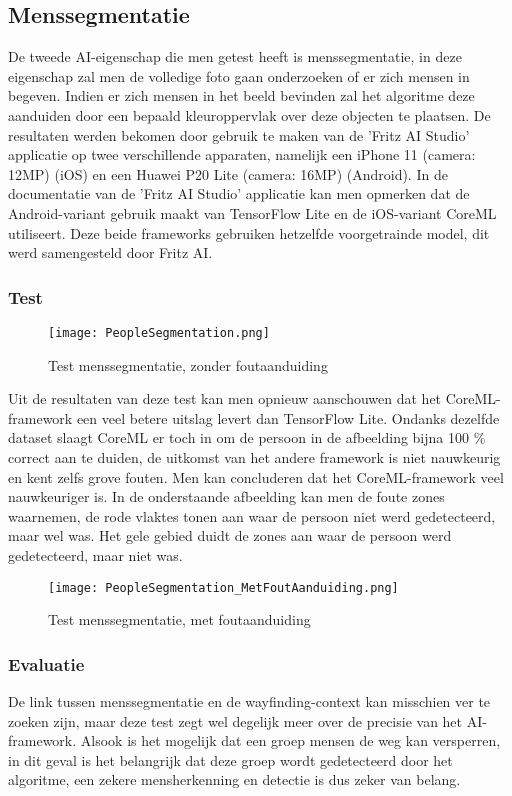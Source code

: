 \subsection{Menssegmentatie}
De tweede AI-eigenschap die men getest heeft is menssegmentatie, in deze eigenschap zal men de volledige foto gaan onderzoeken of er zich mensen in begeven. Indien er zich mensen in het beeld bevinden zal het algoritme deze aanduiden door een bepaald kleuroppervlak over deze objecten te plaatsen. De resultaten werden bekomen door gebruik te maken van de 'Fritz AI Studio' applicatie op twee verschillende apparaten, namelijk een iPhone 11 (camera: 12MP) (iOS) en een Huawei P20 Lite (camera: 16MP) (Android). In de documentatie van de 'Fritz AI Studio' applicatie kan men opmerken dat de Android-variant gebruik maakt van TensorFlow Lite en de iOS-variant CoreML utiliseert. Deze beide frameworks gebruiken hetzelfde voorgetrainde model, dit werd samengesteld door Fritz AI.

\subsubsection{Test}

\begin{figure}[H]
	\centering
	\texttt{[image: PeopleSegmentation.png]}
	\caption{Test menssegmentatie, zonder foutaanduiding}
\end{figure}
Uit de resultaten van deze test kan men opnieuw aanschouwen dat het CoreML-framework een veel betere uitslag levert dan TensorFlow Lite. Ondanks dezelfde dataset slaagt CoreML er toch in om de persoon in de afbeelding bijna 100 \% correct aan te duiden, de uitkomst van het andere framework is niet nauwkeurig en kent zelfs grove fouten. Men kan concluderen dat het CoreML-framework veel nauwkeuriger is. In de onderstaande afbeelding kan men de foute zones waarnemen, de rode vlaktes tonen aan waar de persoon niet werd gedetecteerd, maar wel was. Het gele gebied duidt de zones aan waar de persoon werd gedetecteerd, maar niet was.

\begin{figure}[H]
	\centering
	\texttt{[image: PeopleSegmentation\_MetFoutAanduiding.png]}
	\caption{Test menssegmentatie, met foutaanduiding}
\end{figure}
\subsubsection{Evaluatie}
De link tussen menssegmentatie en de wayfinding-context kan misschien ver te zoeken zijn, maar deze test zegt wel degelijk meer over de precisie van het AI-framework. Alsook is het mogelijk dat een groep mensen de weg kan versperren, in dit geval is het belangrijk dat deze groep wordt gedetecteerd door het algoritme, een zekere mensherkenning en detectie is dus zeker van belang.

